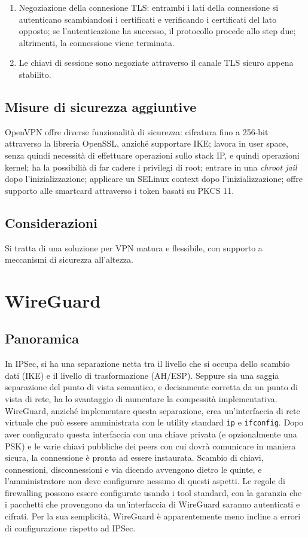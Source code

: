 \begin{enumerate}
    \item Negoziazione della connesione TLS: entrambi i lati della connessione si autenticano scambiandosi i certificati e verificando i certificati del lato opposto; se l'autenticazione ha successo, il protocollo procede allo step due; altrimenti, la connessione viene terminata.
    \item Le chiavi di sessione sono negoziate attraverso il canale TLS sicuro appena stabilito.
\end{enumerate}


\subsection{Misure di sicurezza aggiuntive}
OpenVPN offre diverse funzionalità di sicurezza: cifratura fino a 256-bit attraverso la libreria OpenSSL, anziché supportare IKE; lavora in user space, senza quindi necessità di effettuare operazioni sullo stack IP, e quindi operazioni kernel; ha la possibilià di far cadere i privilegi di root; entrare in una \emph{chroot jail} dopo l'inizializzazione; applicare un SELinux context dopo l'inizializzazione; offre supporto alle smartcard attraverso i token basati su PKCS 11.

\subsection{Considerazioni}
Si tratta di una soluzione per VPN matura e flessibile, con supporto a meccanismi di sicurezza all'altezza.

\section{WireGuard}
\subsection{Panoramica}
In IPSec, si ha una separazione netta tra il livello che si occupa dello scambio dati (IKE) e il livello di trasformazione (AH/ESP). Seppure sia una saggia separazione del punto di vista semantico, e decisamente corretta da un punto di vista di rete, ha lo svantaggio di aumentare la compessità implementativa.
WireGuard, anziché implementare questa separazione, crea un'interfaccia di rete virtuale che può essere amministrata con le utility standard \texttt{ip} e \texttt{ifconfig}. Dopo aver configurato questa interfaccia con una chiave privata (e opzionalmente una PSK) e le varie chiavi pubbliche dei peers con cui dovrà comunicare in maniera sicura, la connessione è pronta ad essere instaurata. Scambio di chiavi, connessioni, disconnessioni e via dicendo avvengono dietro le quinte, e l'amministratore non deve configurare nessuno di questi aspetti.
Le regole di firewalling possono essere configurate usando i tool standard, con la garanzia che i pacchetti che provengono da un'interfaccia di WireGuard saranno autenticati e cifrati. Per la sua semplicità, WireGuard è apparentemente meno incline a errori di configurazione rispetto ad IPSec.

